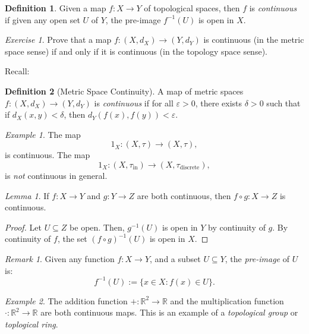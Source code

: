 \documentclass[a4paper]{report}
\theoremstyle{definition}
\newtheorem{definition}{Definition}
\theoremstyle{remark}
\newtheorem{remark}{Remark}
\theoremstyle{proposition}
\theoremstyle{conjecture}
\theoremstyle{lemma}
\newtheorem{lemma}{Lemma}
\theoremstyle{corollary}
\theoremstyle{exercise}
\newtheorem{exercise}{Exercise}
\newtheorem{example}{Example}
\newcommand{\on}{\operatorname}
\begin{document}
\begin{definition}
    Given a map $f:  X \to Y$ of topological spaces, then $f$ is 
    \emph{continuous} if given any open set $U$ of $Y$, the 
    pre-image $f^{-1}(U)$ is open in $X$.
\end{definition}

\begin{exercise}
    Prove that a map $f : (X, d_X) \to (Y,d_Y)$ is continuous (in the 
    metric space sense) if and only if it is continuous (in the topology space
    sense).
\end{exercise}

Recall:

\begin{definition}[Metric Space Continuity]
    A map of metric spaces $f : (X, d_X) \to (Y,d_Y)$ is \emph{continuous} if 
    for all $\varepsilon > 0$, there exists $\delta > 0$ such that if
    $d_X(x,y) < \delta$, then $d_Y(f(x),f(y)) < \varepsilon$.
\end{definition}

\begin{example}
    The map 
    $$1_X : (X,\tau) \longrightarrow (X,\tau),$$
    is continuous. 
    The map 
    $$1_X : (X,\tau_{\on{in}}) \longrightarrow (X,\tau_{\on{discrete}}),$$
    is \emph{not} continuous in general.
\end{example}


\begin{lemma}
    If $f : X \to Y$ and $g : Y \to Z$ are both continuous, then 
    $f \circ g : X \to Z$ is continuous.
\end{lemma}

\begin{proof}
    Let $U\subseteq Z$ be open. Then, $g^{-1}(U)$ is open in $Y$ by continuity
    of $g$. By continuity of $f$, the set $(f\circ g)^{-1}(U)$ is open in $X$.
\end{proof}

\begin{remark}
    Given any function $f:  X \to Y$, and a subset $U \subseteq Y$,
    the \emph{pre-image} of $U$ is:
    $$f^{-1}(U) := \lbrace x \in X : f(x) \in U \rbrace.$$
\end{remark}

\begin{example}
    The addition function $+ : \mathbb{R}^2 \to \mathbb{R}$ and 
    the multiplication function $\cdot : \mathbb{R}^2 \to \mathbb{R}$ 
    are both continuous maps. 
    This is an example of a \emph{topological group} or \emph{toplogical ring}.
\end{example}
\end{document}
